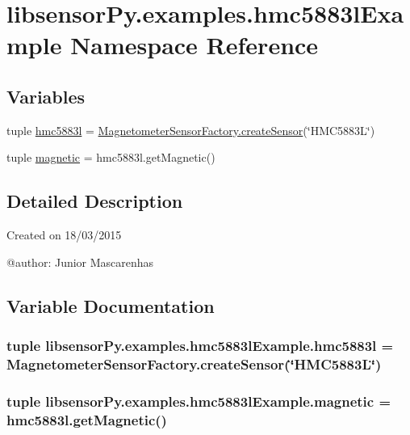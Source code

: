 \hypertarget{namespacelibsensorPy_1_1examples_1_1hmc5883lExample}{}\section{libsensor\+Py.\+examples.\+hmc5883l\+Example Namespace Reference}
\label{namespacelibsensorPy_1_1examples_1_1hmc5883lExample}
\subsection*{Variables}
\begin{DoxyCompactItemize}
\item 
tuple \hyperlink{namespacelibsensorPy_1_1examples_1_1hmc5883lExample_a22babae987a968cb9d7c8186d0f91855}{hmc5883l} = \hyperlink{classconcretefactory_1_1magnetometerSensorFactory_1_1MagnetometerSensorFactory_ab20fa7eddd0b13d22727989f72fa9cde}{Magnetometer\+Sensor\+Factory.\+create\+Sensor}(\char`\"{}H\+M\+C5883\+L\char`\"{})
\item 
tuple \hyperlink{namespacelibsensorPy_1_1examples_1_1hmc5883lExample_a056e8bc9e6b882e2103214203d845b67}{magnetic} = hmc5883l.\+get\+Magnetic()
\end{DoxyCompactItemize}


\subsection{Detailed Description}
\begin{DoxyVerb}Created on 18/03/2015

@author: Junior Mascarenhas
\end{DoxyVerb}
 

\subsection{Variable Documentation}
\hypertarget{namespacelibsensorPy_1_1examples_1_1hmc5883lExample_a22babae987a968cb9d7c8186d0f91855}{}
\subsubsection[{hmc5883l}]{\setlength{\rightskip}{0pt plus 5cm}tuple libsensor\+Py.\+examples.\+hmc5883l\+Example.\+hmc5883l = {\bf Magnetometer\+Sensor\+Factory.\+create\+Sensor}(\char`\"{}H\+M\+C5883\+L\char`\"{})}\label{namespacelibsensorPy_1_1examples_1_1hmc5883lExample_a22babae987a968cb9d7c8186d0f91855}
\hypertarget{namespacelibsensorPy_1_1examples_1_1hmc5883lExample_a056e8bc9e6b882e2103214203d845b67}{}
\subsubsection[{magnetic}]{\setlength{\rightskip}{0pt plus 5cm}tuple libsensor\+Py.\+examples.\+hmc5883l\+Example.\+magnetic = hmc5883l.\+get\+Magnetic()}\label{namespacelibsensorPy_1_1examples_1_1hmc5883lExample_a056e8bc9e6b882e2103214203d845b67}
